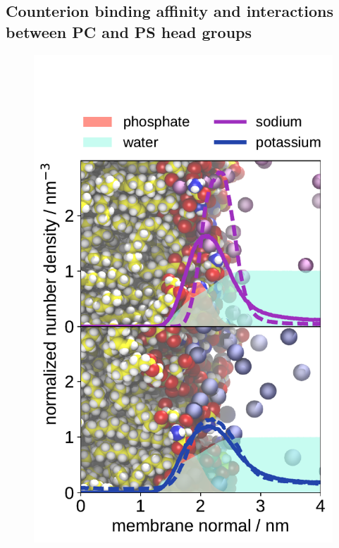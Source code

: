\documentclass[journal=jpcbfk,manuscript=article]{achemso}
\newlength{\figheight}
\begin{document}
 
\subsection{Counterion binding affinity and interactions between PC and PS head groups}

\begin{figure}[tbp!] 
  \centering 
  \includegraphics[height=\figheight]{../img/ecc_pops/density_profiles_na-k-counterions_wat_phos_compar_purePOPS_ecclipids-lipid17.pdf}

\end{figure}
\end{document}
